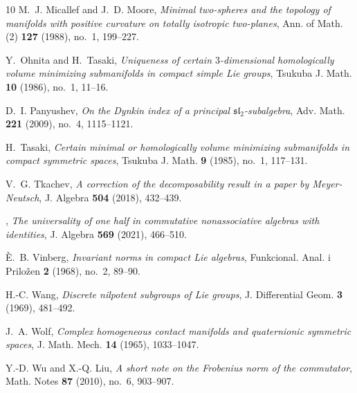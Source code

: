 \documentclass [leqno, 10pt]{amsart}
\theoremstyle{definition}
\numberwithin{equation}{section}
\begin{document}
\begin{thebibliography}{10}
M.~J. Micallef and J.~D. Moore, \emph{Minimal two-spheres and the topology of
  manifolds with positive curvature on totally isotropic two-planes}, Ann. of
  Math. (2) \textbf{127} (1988), no.~1, 199--227.

Y.~Ohnita and H.~Tasaki, \emph{Uniqueness of certain {$3$}-dimensional
  homologically volume minimizing submanifolds in compact simple {L}ie groups},
  Tsukuba J. Math. \textbf{10} (1986), no.~1, 11--16.

D.~I. Panyushev, \emph{On the {D}ynkin index of a principal
  {$\mathfrak{sl}_2$}-subalgebra}, Adv. Math. \textbf{221} (2009), no.~4,
  1115--1121.

H.~Tasaki, \emph{Certain minimal or homologically volume minimizing
  submanifolds in compact symmetric spaces}, Tsukuba J. Math. \textbf{9}
  (1985), no.~1, 117--131.

V.~G. Tkachev, \emph{A correction of the decomposability result in a paper by
  {M}eyer-{N}eutsch}, J. Algebra \textbf{504} (2018), 432--439.

\bysame, \emph{The universality of one half in commutative nonassociative
  algebras with identities}, J. Algebra \textbf{569} (2021), 466--510.

{\`E}.~B. Vinberg, \emph{Invariant norms in compact {L}ie algebras},
  Funkcional. Anal. i Prilo\v zen \textbf{2} (1968), no.~2, 89--90.

H.-C. Wang, \emph{Discrete nilpotent subgroups of {L}ie groups}, J.
  Differential Geom. \textbf{3} (1969), 481--492.

J.~A. Wolf, \emph{Complex homogeneous contact manifolds and quaternionic
  symmetric spaces}, J. Math. Mech. \textbf{14} (1965), 1033--1047.

Y.-D. Wu and X.-Q. Liu, \emph{A short note on the {F}robenius norm of the
  commutator}, Math. Notes \textbf{87} (2010), no.~6, 903--907.

\end{thebibliography}
\end{document}
